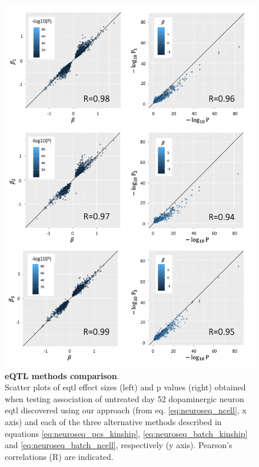 \begin{figure}[htbp]
\centering
\includegraphics[width=13.5cm]{Chapter5/Fig/neuroseq_eqtl_methods_corr.png}
\caption[eQTL methods comparison]{\textbf{eQTL methods comparison}.\\
Scatter plots of \gls{eqtl} effect sizes (left) and p values (right) obtained when testing association of untreated day 52 dopaminergic neuron \gls{eqtl} discovered using our approach (from eq. \eqref{eq:neuroseq_ncell}, x axis) and each of the three alternative methods described in equations \eqref{eq:neuroseq_pcs_kinship}, \eqref{eq:neuroseq_batch_kinship} and \eqref{eq:neuroseq_batch_ncell}, respectively (y axis). 
Pearson's correlations (R) are indicated.}
\label{fig:neuroseq_eqtl_methods_comp}
\end{figure}


